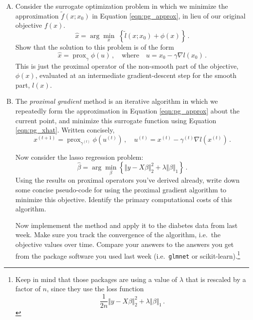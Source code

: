 \documentclass{mynotes}
\newcommand{\prox}{ \mathop{\mathrm{prox}} }
\newcommand{\enorm}[1]{\Vert #1 \Vert_2}
\begin{document}
\begin{enumerate}[(A)]
\item Consider the surrogate optimization problem in which we minimize the approximation $\tilde{f}(x; x_0)$ in Equation \ref{eqn:pg_approx}, in lieu of our original objective $f(x)$. 
$$
\hat{x} = \arg \min_x \; \left\{   \tilde{l}(x; x_0) + \phi(x)  \right\} \, .
$$
Show that the solution to this problem is of the form
\begin{equation}
\label{eqn:pg_xhat}
\hat{x} = \prox_{\gamma} \phi(u) \, , \quad \mbox{where} \quad u = x_0 - \gamma \nabla l(x_0) \, .
\end{equation}
This is just the proximal operator of the non-smooth part of the objective, $\phi(x)$, evaluated at an intermediate gradient-descent step for the smooth part, $l(x)$.


\item The \textit{proximal gradient} method is an iterative algorithm in which we repeatedly form the approximation in Equation \ref{eqn:pg_approx} about the current point, and minimize this surrogate function using Equation \ref{eqn:pg_xhat}.  Written concisely,
$$
x^{(t+1)} = \prox_{\gamma^{(t)}} \phi(u^{(t)}) \, , \quad u^{(t)} = x^{(t)} - \gamma^{(t)} \nabla l(x^{(t)}) \, .
$$

Now consider the lasso regression problem:
$$
\hat{\beta} = \arg \min_{\beta} \left\{  \enorm{y - X\beta}^2 + \lambda \Vert \beta \Vert_1 \right\} \, .
$$
Using the results on proximal operators you've derived already, write down some concise pseudo-code for using the proximal gradient algorithm to minimize this objective.  Identify the primary computational costs of this algorithm.

Now implemement the method and apply it to the diabetes data from last week.  Make sure you track the convergence of the algorithm, i.e.~the objective values over time.  Compare your answers to the answers you get from the package software you used last week (i.e.~\verb|glmnet| or scikit-learn).\footnote{Keep in mind that those packages are using a value of $\lambda$ that is rescaled by a factor of $n$, since they use the loss function
$$
\frac{1}{2n} \enorm{y - X\beta}^2  + \lambda \Vert \beta \Vert_1 \, .
$$
}


\end{enumerate}
\end{document}
